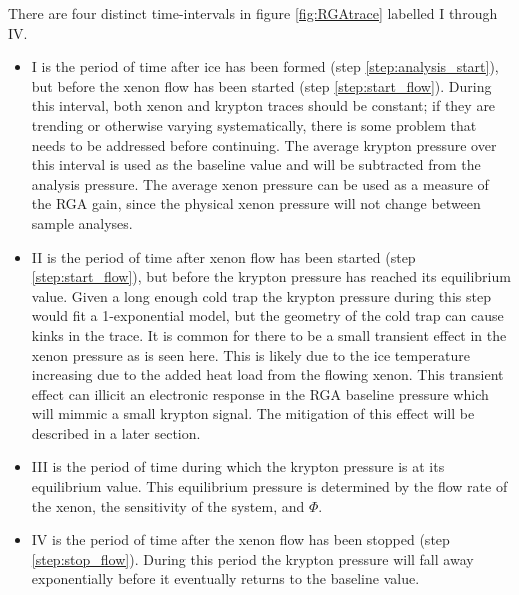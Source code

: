 \documentclass[12pt]{article}
\begin{document}
There are four distinct time-intervals in figure \ref{fig:RGAtrace} labelled I through IV. 
\begin{itemize}
\item I is the period of time after ice has been formed (step \ref{step:analysis_start}), but before the xenon flow has been started (step \ref{step:start_flow}). During this interval, both xenon and krypton traces should be constant; if they are trending or otherwise varying systematically, there is some problem that needs to be addressed before continuing. The average krypton pressure over this interval is used as the baseline value and will be subtracted from the analysis pressure. The average xenon pressure can be used as a measure of the RGA gain, since the physical xenon pressure will not change between sample analyses. 
\item II is the period of time after xenon flow has been started (step \ref{step:start_flow}), but before the krypton pressure has reached its equilibrium value. Given a long enough cold trap the krypton pressure during this step would fit a 1-exponential model, but the geometry of the cold trap can cause kinks in the trace. It is common for there to be a small transient effect in the xenon pressure as is seen here. This is likely due to the ice temperature increasing due to the added heat load from the flowing xenon. This transient effect can illicit an electronic response in the RGA baseline pressure which will mimmic a small krypton signal. The mitigation of this effect will be described in a later section.
\item III is the period of time during which the krypton pressure is at its equilibrium value. This equilibrium pressure is determined by the flow rate of the xenon, the sensitivity of the system, and $\Phi$.
\item IV is the period of time after the xenon flow has been stopped (step \ref{step:stop_flow}). During this period the krypton pressure will fall away exponentially before it eventually returns to the baseline value.
\end{itemize}
\end{document}

